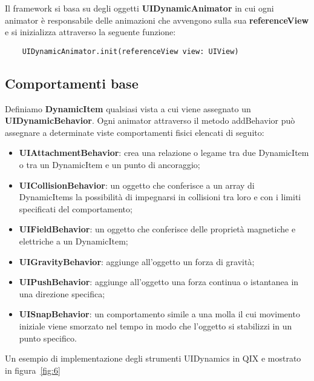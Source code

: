 Il framework si basa su degli oggetti \textbf{UIDynamicAnimator} in cui ogni animator è responsabile delle
animazioni che avvengono sulla sua \textbf{referenceView} e si inizializza 
attraverso la seguente funzione:

\begin{verbatim}
    UIDynamicAnimator.init(referenceView view: UIView)
\end{verbatim}


\subsection{Comportamenti base}

Definiamo \textbf{DynamicItem} qualsiasi vista a cui viene assegnato un \textbf{UIDynamicBehavior}.
Ogni animator attraverso il metodo addBehavior può assegnare a determinate
viste comportamenti fisici elencati di seguito: 

\begin{itemize}
    \item\textbf{UIAttachmentBehavior}: crea una relazione o legame tra due DynamicItem o tra un DynamicItem e un punto di ancoraggio;
    \item\textbf{UICollisionBehavior}: un oggetto che conferisce a un array di DynamicItems la possibilità di impegnarsi in collisioni tra loro e con i limiti specificati del comportamento;
    \item\textbf{UIFieldBehavior}: un oggetto che conferisce delle proprietà magnetiche e elettriche a un DynamicItem;
    \item\textbf{UIGravityBehavior}: aggiunge all'oggetto un forza di gravità;
    \item\textbf{UIPushBehavior}: aggiunge all'oggetto una forza continua o istantanea in una direzione specifica;
    \item\textbf{UISnapBehavior}: un comportamento simile a una molla il cui movimento iniziale viene smorzato nel tempo in modo che l'oggetto si stabilizzi in un punto specifico.
\end{itemize}

Un esempio di implementazione degli strumenti UIDynamics in QIX e mostrato in figura~\ref{fig:6}

